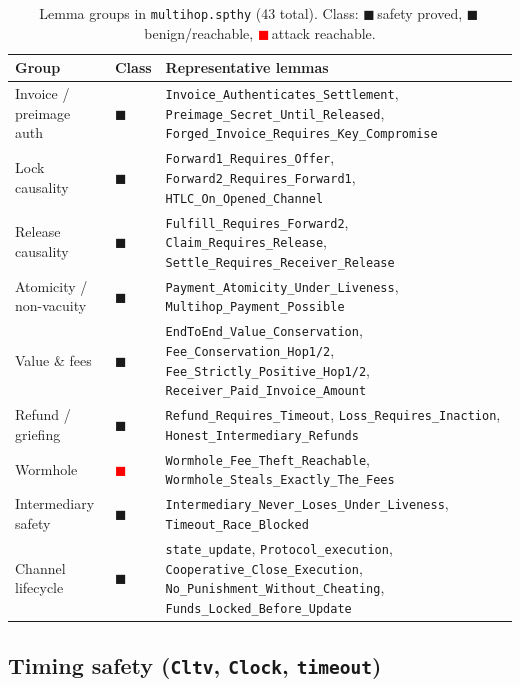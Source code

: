 \documentclass[11pt]{article}
\newcommand{\gc}{\textcolor{okgreen}{$\blacksquare$}}
\newcommand{\ac}{\textcolor{amber}{$\blacksquare$}}
\newcommand{\rc}{\textcolor{red}{$\blacksquare$}}
\begin{document}
\begin{table}[h]
\centering
\small
\begin{tabular}{@{}llp{7.2cm}@{}}
\toprule
\textbf{Group} & \textbf{Class} & \textbf{Representative lemmas} \\
\midrule
Invoice / preimage auth & \gc & \texttt{Invoice_Authenticates_Settlement}, \texttt{Preimage_Secret_Until_Released}, \texttt{Forged_Invoice_Requires_Key_Compromise} \\
Lock causality          & \gc & \texttt{Forward1_Requires_Offer}, \texttt{Forward2_Requires_Forward1}, \texttt{HTLC_On_Opened_Channel} \\
Release causality       & \gc & \texttt{Fulfill_Requires_Forward2}, \texttt{Claim_Requires_Release}, \texttt{Settle_Requires_Receiver_Release} \\
Atomicity / non-vacuity & \gc & \texttt{Payment_Atomicity_Under_Liveness}, \texttt{Multihop_Payment_Possible} \\
Value \& fees           & \gc & \texttt{EndToEnd_Value_Conservation}, \texttt{Fee_Conservation_Hop1/2}, \texttt{Fee_Strictly_Positive_Hop1/2}, \texttt{Receiver_Paid_Invoice_Amount} \\
Refund / griefing       & \ac & \texttt{Refund_Requires_Timeout}, \texttt{Loss_Requires_Inaction}, \texttt{Honest_Intermediary_Refunds} \\
Wormhole                & \rc & \texttt{Wormhole_Fee_Theft_Reachable}, \texttt{Wormhole_Steals_Exactly_The_Fees} \\
Intermediary safety     & \gc & \texttt{Intermediary_Never_Loses_Under_Liveness}, \texttt{Timeout_Race_Blocked} \\
Channel lifecycle       & \gc & \texttt{state_update}, \texttt{Protocol_execution}, \texttt{Cooperative_Close_Execution}, \texttt{No_Punishment_Without_Cheating}, \texttt{Funds_Locked_Before_Update} \\
\bottomrule
\end{tabular}
\caption{Lemma groups in \texttt{multihop.spthy} (43 total). Class:
\gc\,safety proved, \ac\,benign/reachable, \rc\,attack reachable.}
\label{tab:multihop}
\end{table}

\subsection{Timing safety (\texttt{Cltv}, \texttt{Clock}, \texttt{timeout})}
\end{document}
